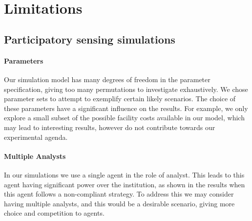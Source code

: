 


\section{Limitations}

\subsection{Participatory sensing simulations}

\paragraph{Parameters} Our simulation model has many degrees of freedom in the
parameter specification, giving too many permutations to investigate
exhaustively. We chose parameter sets to attempt to exemplify certain likely
scenarios. The choice of these parameters have a significant influence on the
results. For example, we only explore a small subset of the possible facility costs
available in our model, which may lead to interesting results, however do not
contribute towards our experimental agenda.

\paragraph{Multiple Analysts}  In our simulations we use a single agent in the
role of analyst. This leads to this agent having significant power over the
institution, as shown in the results when this agent follows a non-compliant
strategy. To address this we may consider having multiple analysts, and this
would be a desirable scenario, giving more choice and competition to agents.

